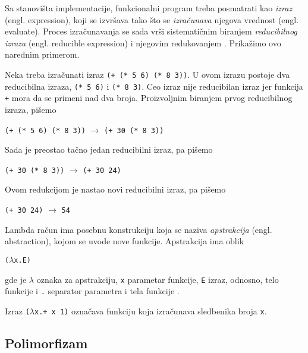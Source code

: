 Sa stanovišta implementacije, funkcionalni program treba posmatrati kao \textit{izraz} (engl. expression), koji se izvršava tako što se \textit{izračunava} njegova vrednost (engl. evaluate). Proces izračunavanja se sada vrši sistematičnim biranjem \textit{reducibilnog izraza} (engl. reducible expression) i njegovim redukovanjem \cite{the-implementation-of-functional-programming-languages}. Prikažimo ovo narednim primerom.

\begin{primer}
	Neka treba izračunati izraz \verb|(+ (* 5 6) (* 8 3))|. U ovom izrazu postoje dva reducibilna izraza, \verb|(* 5 6)| i \verb|(* 8 3)|. Ceo izraz nije reducibilan izraz jer funkcija \verb|+| mora da se primeni nad dva broja. Proizvoljnim biranjem prvog reducibilnog izraza, pišemo
	\begin{center}
		\verb|(+ (* 5 6) (* 8 3))| $\rightarrow$ \verb|(+ 30 (* 8 3))|
	\end{center}
	Sada je preostao tačno jedan reducibilni izraz, pa pišemo
	\begin{center}
		\verb|(+ 30 (* 8 3))| $\rightarrow$ \verb|(+ 30 24)|
	\end{center}
	Ovom redukcijom je nastao novi reducibilni izraz, pa pišemo
	\begin{center}
		\verb|(+ 30 24)| $\rightarrow$ \verb|54|
	\end{center}
\end{primer}

Lambda račun ima posebnu konstrukciju koja se naziva \textit{apstrakcija} (engl. abstraction), kojom se uvode nove funkcije. Apstrakcija ima oblik
\begin{center}
	\verb|(|$\lambda$\verb|x.E)|
\end{center} 
gde je $\lambda$ oznaka za apstrakciju, \verb|x| parametar funkcije, \verb|E| izraz, odnosno, telo funkcije i \verb|.| separator parametra i tela funkcije \cite{the-implementation-of-functional-programming-languages}.  
\begin{primer}
	Izraz \verb|(|$\lambda$\verb|x.+ x 1)| označava funkciju koja izračunava sledbenika broja \verb|x|.
\end{primer}


\subsection{Polimorfizam}
\label{subsec:polimorfizam}

